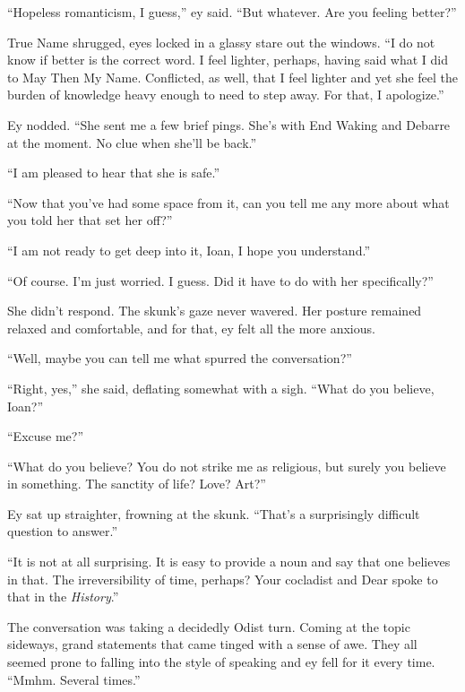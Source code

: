 ``Hopeless romanticism, I guess,'' ey said. ``But whatever. Are you feeling better?''

True Name shrugged, eyes locked in a glassy stare out the windows. ``I do not know if better is the correct word. I feel lighter, perhaps, having said what I did to May Then My Name. Conflicted, as well, that I feel lighter and yet she feel the burden of knowledge heavy enough to need to step away. For that, I apologize.''

Ey nodded. ``She sent me a few brief pings. She's with End Waking and Debarre at the moment. No clue when she'll be back.''

``I am pleased to hear that she is safe.''

``Now that you've had some space from it, can you tell me any more about what you told her that set her off?''

``I am not ready to get deep into it, Ioan, I hope you understand.''

``Of course. I'm just worried. I guess. Did it have to do with her specifically?''

She didn't respond. The skunk's gaze never wavered. Her posture remained relaxed and comfortable, and for that, ey felt all the more anxious.

``Well, maybe you can tell me what spurred the conversation?''

``Right, yes,'' she said, deflating somewhat with a sigh. ``What do you believe, Ioan?''

``Excuse me?''

``What do you believe? You do not strike me as religious, but surely you believe in something. The sanctity of life? Love? Art?''

Ey sat up straighter, frowning at the skunk. ``That's a surprisingly difficult question to answer.''

``It is not at all surprising. It is easy to provide a noun and say that one believes in that. The irreversibility of time, perhaps? Your cocladist and Dear spoke to that in the \emph{History}.''

The conversation was taking a decidedly Odist turn. Coming at the topic sideways, grand statements that came tinged with a sense of awe. They all seemed prone to falling into the style of speaking and ey fell for it every time. ``Mmhm. Several times.''


